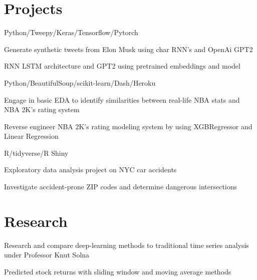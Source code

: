 \documentclass[]{deedy-resume-openfont}
\begin{document}
\begin{minipage}[t]{0.66\textwidth}

\section{Projects}
\location{}
\begin{tightemize} 
\item Python/Tweepy/Keras/Tensorflow/Pytorch
\item Generate synthetic tweets from Elon Musk using char RNN's and OpenAi GPT2
\item RNN LSTM architecture and GPT2 using pretrained embeddings and model
\end{tightemize}
\location{}
\begin{tightemize} 
\item Python/BeautifulSoup/scikit-learn/Dash/Heroku 
\item Engage in basic EDA to identify similarities between real-life NBA stats and NBA 2K's rating system
\item Reverse engineer NBA 2K's rating modeling system by using XGBRegressor and Linear Regression
\end{tightemize}
\location{}
\begin{tightemize} 
\item R/tidyverse/R Shiny
\item Exploratory data analysis project on NYC car accidents 
\item Investigate accident-prone ZIP codes and determine dangerous intersections
\end{tightemize}
\sectionsep


\section{Research}
\begin{tightemize} 
\item Research and compare deep-learning methods to traditional time series analysis under Professor Knut Solna
\item Predicted stock returns with sliding window and moving average methods
\end{tightemize}
\sectionsep


\end{minipage}
\end{document}
